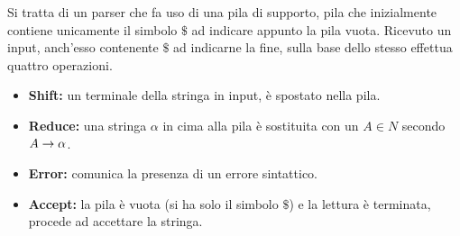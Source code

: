 \documentclass{subfiles}
\begin{document}
Si tratta di un parser che fa uso di una pila di supporto, pila che inizialmente contiene unicamente il simbolo $\$$
ad indicare appunto la pila vuota. Ricevuto un input, anch'esso contenente $\$$ ad indicarne la fine,
sulla base dello stesso effettua quattro operazioni.
\begin{itemize}
    \item \textbf{Shift:} un terminale della stringa in input, è spostato nella pila.
    \item \textbf{Reduce:} una stringa $\alpha$ in cima alla pila è sostituita con un $A \in N$ secondo $\Grammar{A}{\alpha}$.
    \item \textbf{Error:} comunica la presenza di un errore sintattico.
    \item \textbf{Accept:} la pila è vuota (si ha solo il simbolo $\$$) e la lettura è terminata,
          procede ad accettare la stringa.
\end{itemize}
\end{document}
